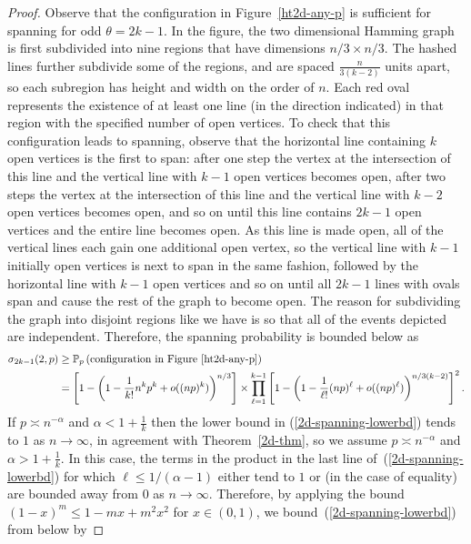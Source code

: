 \begin{proof}
Observe that the configuration in Figure~\ref{ht2d-any-p} is sufficient for spanning for odd $\theta = 2k-1$.  In the figure, the two dimensional Hamming graph is first subdivided into nine regions that have dimensions $n/3 \times n/3$.  The hashed lines further subdivide some of the regions, and are spaced $\frac{n}{3(k-2)}$ units apart, so each subregion has height and width on the order of $n$.  Each red oval represents the existence of at least one line (in the direction indicated) in that region with the specified number of open vertices.  To check that this configuration leads to spanning, observe that the horizontal line containing $k$ open vertices is the first to span: after one step the vertex at the intersection of this line and the vertical line with $k-1$ open vertices becomes open, after two steps the vertex at the intersection of this line and the vertical line with $k-2$ open vertices becomes open, and so on until this line contains $2k-1$ open vertices and the entire line becomes open.  As this line is made open, all of the vertical lines each gain one additional open vertex, so the vertical line with $k-1$ initially open vertices is next to span in the same fashion, followed by the horizontal line with $k-1$ open vertices and so on until all $2k-1$ lines with ovals span and cause the rest of the graph to become open.  The reason for subdividing the graph into disjoint regions like we have is so that all of the events depicted are independent.  Therefore, the spanning probability is bounded below as
\begin{equation}
\label{2d-spanning-lowerbd}
\begin{aligned}
\sigma_{2k-1}(2,p) &\geq \mathbb{P}_{p}\left(\text{configuration in Figure~\ref{ht2d-any-p}}\right) \\
&= \left[ 1 - \left( 1 - \frac{1}{k!} n^k p^k + o((np)^k) \right)^{n/3} \right] \times  \prod_{\ell = 1}^{k-1} \left[1 - \left(1 - \frac{1}{\ell !}(np)^{\ell} + o((np)^{\ell}) \right)^{n/3(k-2)} \right]^2.
\end{aligned}
\end{equation}
If $p \asymp n^{-\alpha}$ and $\alpha < 1 + \frac{1}{k}$ then the lower bound in (\ref{2d-spanning-lowerbd}) tends to $1$ as $n\to \infty$, in agreement with Theorem~\ref{2d-thm}, so we assume $p \asymp n^{-\alpha}$ and $\alpha > 1+\frac{1}{k}$.  In this case, the terms in the product in the last line of~(\ref{2d-spanning-lowerbd}) for which $\ell \leq 1/(\alpha-1)$ either tend to $1$ or (in the case of equality) are bounded away from $0$ as $n \to \infty$.  Therefore, by applying the bound $(1-x)^m \leq 1 - mx + m^2 x^2$ for $x\in(0,1)$, we bound~(\ref{2d-spanning-lowerbd}) from below by

\end{proof}
